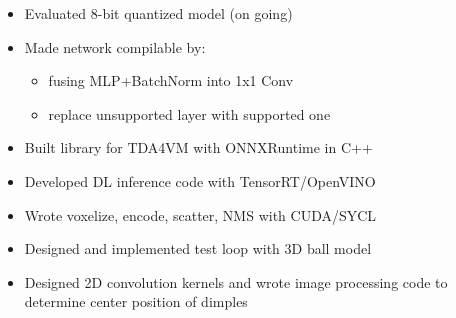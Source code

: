 \documentclass[10pt,a4paper,ragged2e,withhyper]{altacv}
\begin{document}
\begin{paracol}{2}
  \smallskip
 
  \begin{itemize}
    \item Evaluated 8-bit quantized model (on going)
    \item Made network compilable by:
    \smallskip
    \begin{itemize}
      \item fusing MLP+BatchNorm into 1x1 Conv
      \item replace unsupported layer with supported one%
  \end{itemize}
    \item Built library for TDA4VM with ONNXRuntime in C++
  \end{itemize}

  \smallskip

  \begin{itemize}{}{}{}
    \item Developed DL inference code with TensorRT/OpenVINO
    \item Wrote voxelize, encode, scatter, NMS with CUDA/SYCL
  \end{itemize}

  \smallskip

  \begin{itemize}
    \item Designed and implemented test loop with 3D ball model
    \item Designed 2D convolution kernels and wrote image processing code to determine center position of dimples
  \end{itemize}

  \smallskip
 
 

\end{paracol}
\end{document}
